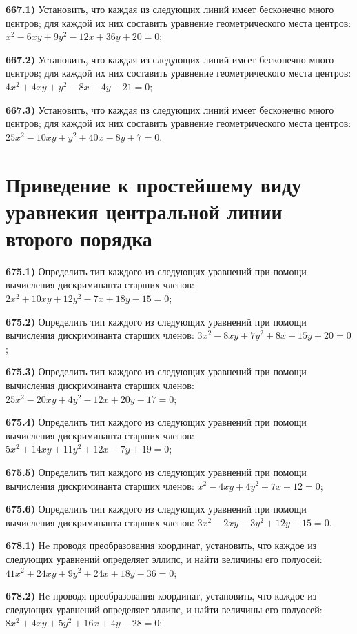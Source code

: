 \textbf{667.1)} Установить, что каждая из следующих линий имєет бесконечно много цєнтров; для каждой их них составить уравнение геометрического места центров: $x^2-6 x y+9 y^2-12 x+36 y+20=0$;

\textbf{667.2)} Установить, что каждая из следующих линий имєет бесконечно много цєнтров; для каждой их них составить уравнение геометрического места центров: $4 x^2+4 x y+y^2-8 x-4 y-21=0$;

\textbf{667.3)} Установить, что каждая из следующих линий имєет бесконечно много цєнтров; для каждой их них составить уравнение геометрического места центров: $25 x^2-10 x y+y^2+40 x-8 y+7=0$.



\section{Приведение к простейшему виду уравнекия центральной линии второго порядка}



\textbf{675.1)} Определить тип каждого из следующих уравнений при помощи вычисления дискриминанта старших членов: $2 x^2+10 x y+12 y^2-7 x+18 y-15=0$;

\textbf{675.2)} Определить тип каждого из следующих уравнений при помощи вычисления дискриминанта старших членов: $3 x^2-8 x y+7 y^2+8 x-15 y+20=0$;

\textbf{675.3)} Определить тип каждого из следующих уравнений при помощи вычисления дискриминанта старших членов: $25 x^2-20 x y+4 y^2-12 x+20 y-17=0$;

\textbf{675.4)} Определить тип каждого из следующих уравнений при помощи вычисления дискриминанта старших членов: $5 x^2+14 x y+11 y^2+12 x-7 y+19=0$;

\textbf{675.5)} Определить тип каждого из следующих уравнений при помощи вычисления дискриминанта старших членов: $x^2-4 x y+4 y^2+7 x-12=0$;

\textbf{675.6)} Определить тип каждого из следующих уравнений при помощи вычисления дискриминанта старших членов: $3 x^2-2 x y-3 y^2+12 y-15=0$.

\textbf{678.1)} He проводя преобразования координат, установить, что каждое из следующих уравнений определяет эллипс, и найти величины его полуосей: $41 x^2+24 x y+9 y^2+24 x+18 y-36=0$;

\textbf{678.2)} He проводя преобразования координат, установить, что каждое из следующих уравнений определяет эллипс, и найти величины его полуосей: $8 x^2+4 x y+5 y^2+16 x+4 y-28=0$;


